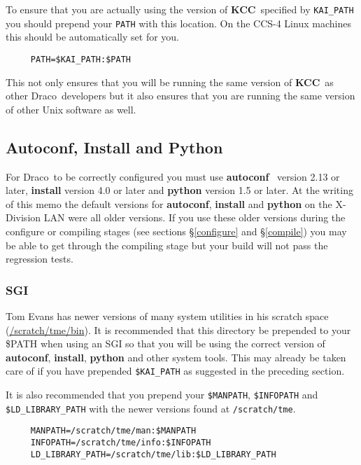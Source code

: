 \documentclass[10pt]{nmemo}
\newcommand{\comp}[1]{\normalfont\normalsize\texttt{#1}}
\newcommand{\draco}{{\normalfont\sffamily Draco}}
\newcommand{\kcc}{{\normalfont\bfseries KCC}}
\begin{document}
To ensure that you are actually using the version of \kcc\ specified by
\comp{KAI\_PATH} you should prepend your \comp{PATH} with this
location.  On the CCS-4 Linux machines this should be automatically
set for you. 

\footnotesize
\begin{verbatim}
     PATH=$KAI_PATH:$PATH
\end{verbatim}
\normalsize

This not only ensures that you will be running the same version of
\kcc\ as other \draco\ developers but it also ensures that you are
running the same version of other Unix software as well.

\subsection{Autoconf, Install and Python}

For \draco\ to be correctly configured you must use
\textbf{autoconf}~\cite{autoconf} version 2.13 or later, \textbf{install}
version 4.0 or later and \textbf{python} version 1.5 or later.  At the
writing of this memo the default versions for \textbf{autoconf},
\textbf{install} and \textbf{python} on the X-Division LAN were all older
versions.  If you use these older versions during the configure or
compiling stages (see sections \S\ref{configure} and \S\ref{compile})
you may be able to get through the compiling stage but your build will
not pass the regression tests.  

\subsubsection{SGI}

Tom Evans has newer versions of many system utilities in his scratch
space (\url{/scratch/tme/bin}).  It is recommended that this
directory be prepended to your \$PATH when using an SGI so that you
will be using the correct version of \textbf{autoconf},
\textbf{install}, \textbf{python} and other system tools.  This may
already be taken care of if you have prepended \comp{\$KAI\_PATH} as
suggested in the preceding section.

It is also recommended that you prepend your \comp{\$MANPATH},
\comp{\$INFOPATH} and \comp{\$LD\_LIBRARY\_PATH} with the newer
versions found at \comp{/scratch/tme}.

\footnotesize
\begin{verbatim}
     MANPATH=/scratch/tme/man:$MANPATH
     INFOPATH=/scratch/tme/info:$INFOPATH
     LD_LIBRARY_PATH=/scratch/tme/lib:$LD_LIBRARY_PATH
\end{verbatim} %
\normalsize
\end{document}
